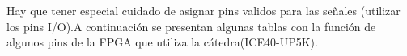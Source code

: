 \documentclass{article}
\begin{document}
 Hay que tener especial cuidado de asignar pins validos para las señales (utilizar los pins I/O).A continuación se presentan algunas tablas con la función de algunos pins de la FPGA que utiliza la cátedra(ICE40-UP5K).
 \begin{figure}[H]
 \centering
	\end{figure}
	
\end{document}
